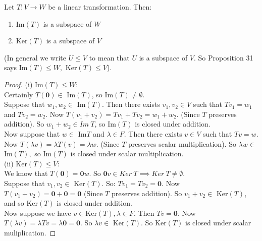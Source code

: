 \begin{proposition} Let $T : V \to W$ be a linear transformation. Then:
\begin{enumerate}
\item Im$(T)$ is a subspace of $W$
\item Ker$(T)$ is a subspace of $V$
\end{enumerate}
\end{proposition}

(In general we write $U \leq V$ to mean that $U$ is a subspace of $V$. So Proposition 31 says Im$(T) \leq W, $ Ker$(T) \leq V$). 

\begin{proof}
(i) Im$(T) \leq W$: \\

Certainly $T(\mathbf{0}) \in $ Im$(T)$, so Im$(T) \neq \emptyset$.\\

Suppose that $w_1, w_2 \in $ Im$(T)$. Then there exists $v_1, v_2 \in V$ such that $Tv_1 = w_1$ and $Tv_2 = w_2$. Now $T(v_1 + v_2) = Tv_1 + Tv_2 = w_1 + w_2$. (Since $T$ preserves addition). So $w_1 + w_2 \in Im ~T$, so Im$(T)$ is closed under addition. \\

Now suppose that $w \in $ Im$T$ and $\lambda \in F$. Then there exists $v \in V$ such that $Tv = w$. Now $T(\lambda v) = \lambda T(v) = \lambda w$. (Since $T$ preserves scalar multiplication). So $\lambda w \in $ Im$(T),$ so Im$(T)$ is closed under scalar multiplication.\\

\noindent (ii) Ker$(T) \leq V$:\\

We know that $T(\mathbf{0}) = \mathbf{0}w.$ So $\mathbf{0}v \in Ker~ T \implies Ker~ T \neq \emptyset.$\\

Suppose that $v_1, v_2 \in $ Ker$(T)$. So: $Tv_1 = Tv_2 = \mathbf{0}.$ Now $T(v_1 + v_2) = \mathbf{0} + \mathbf{0} = \mathbf{0}$ (Since $T$ preserves addition). So $v_1 + v_2 \in $ Ker$(T)$, and so Ker$(T)$ is closed under addition.\\

Now suppose we have $v \in \text{Ker}(T), \lambda \in F.$ Then $Tv = \mathbf{0}.$ Now $T(\lambda v) = \lambda Tv = \lambda \mathbf{0} = \mathbf{0}.$ So $\lambda v \in $ Ker$(T).$ So Ker$(T)$ is closed under scalar muliplication. 
\end{proof}\vspace*{5pt}

